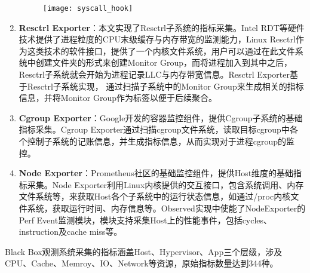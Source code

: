 \begin{enumerate}
    \begin{figure}[H]
        \centering
        \texttt{[image: syscall\_hook]}
        \label{fig:syscall_hook}
    \end{figure}

    \item \textbf{Resctrl Exporter}：本文实现了Resctrl子系统的指标采集。Intel RDT等硬件技术提供了进程粒度的CPU末级缓存与内存带宽的监测能力，Linux Resctrl作为这类技术的软件接口，提供了一个内核文件系统，用户可以通过在此文件系统中创建文件夹的形式来创建Monitor Group，而将进程加入到其中之后，Resctrl子系统就会开始为进程记录LLC与内存带宽信息。Resctrl Exporter基于Resctrl子系统实现， 通过扫描子系统中的Monitor Group来生成相关的指标信息，并将Monitor Group作为标签以便于后续聚合。
    
    \item \textbf{Cgroup Exporter}：Google开发的容器监控组件，提供Cgroup子系统的基础指标采集。Cgroup Exporter通过扫描cgroup文件系统，读取目标cgroup中各个控制子系统的记账信息，并生成指标信息，从而实现对于进程cgroup的监控。
    
    \item \textbf{Node Exporter}：Prometheus社区的基础监控组件，提供Host维度的基础指标采集。Node Exporter利用Linux内核提供的交互接口，包含系统调用、内存文件系统等，来获取Host各个子系统中的运行状态信息，如通过/proc内核文件系统，获取运行时间、内存信息等。Observed实现中使能了NodeExporter的Perf Event监测模块，模块支持采集Host上的性能事件，包括cycles、instruction及cache miss等。

\end{enumerate}


Black Box观测系统采集的指标涵盖Host、Hypervisor、App三个层级，涉及CPU、Cache、Memroy、IO、Network等资源，原始指标数量达到344种。

